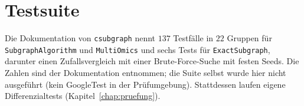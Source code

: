 \section{Testsuite}

Die Dokumentation von \texttt{csubgraph} nennt $137$ Testfälle in $22$ Gruppen für \texttt{SubgraphAlgorithm} und \texttt{MultiOmics} und sechs Tests für \texttt{ExactSubgraph}, darunter einen Zufallsvergleich mit einer Brute-Force-Suche mit festen Seeds. Die Zahlen sind der Dokumentation entnommen; die Suite selbst wurde hier nicht ausgeführt (kein GoogleTest in der Prüfumgebung). Stattdessen laufen eigene Differenzialtests (Kapitel~\ref{chap:pruefung}).
